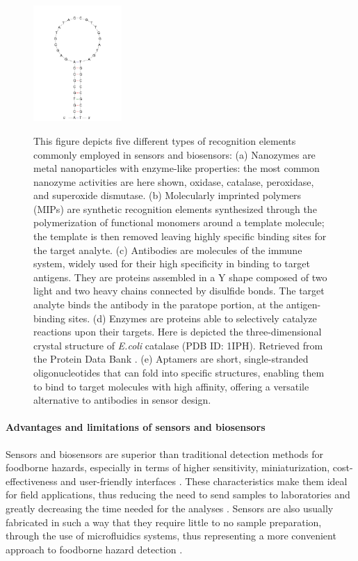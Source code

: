 \begin{figure}[!ht]
{        \includegraphics[width=0.3\textwidth]{figures/chapter1/sensors/Fig1_Aptamer.pdf}
        \label{fig:apta}
    }
    \caption{This figure depicts five different types of recognition elements commonly employed in sensors and biosensors:
    (a) Nanozymes are metal nanoparticles with enzyme-like properties: the most common nanozyme activities are here shown, \ie{} oxidase, catalase, peroxidase, and superoxide dismutase.
    (b) Molecularly imprinted polymers (MIPs) are synthetic recognition elements synthesized through the polymerization of functional monomers around a template molecule; the template is then removed leaving highly specific binding sites for the target analyte.
    (c) Antibodies are molecules of the immune system, widely used for their high specificity in binding to target antigens. They are proteins assembled in a Y shape composed of two light and two heavy chains connected by disulfide bonds. The target analyte binds the antibody in the paratope portion, \ie{} at the antigen-binding sites.  
    (d) Enzymes are proteins able to selectively catalyze reactions upon their targets. Here is depicted the three-dimensional crystal structure of \textit{E.coli} catalase (PDB ID: 1IPH). Retrieved from the Protein Data Bank \citep{bravoCrystal1995,bravoRCSB}.
    (e) Aptamers are short, single-stranded oligonucleotides that can fold into specific structures, enabling them to bind to target molecules with high affinity, offering a versatile alternative to antibodies in sensor design.}
    \label{fig:recognitionElements}
\end{figure}

\paragraph{Advantages and limitations of sensors and biosensors}
Sensors and biosensors are superior than traditional detection methods for foodborne hazards, especially in terms of higher sensitivity, miniaturization, cost-effectiveness and user-friendly interfaces \citep{perfezouCancer2012,cardenosa-rubioRecent2019,yangDynamic2022}. These characteristics make them ideal for field applications, thus reducing the need to send samples to laboratories and greatly decreasing the time needed for the analyses \citep{byrneAntibodyBased2009,sonPortable2017,zhangApplying2017}. Sensors are also usually fabricated in such a way that they require little to no sample preparation, \eg{} through the use of microfluidics systems, thus representing a more convenient approach to foodborne hazard detection \citep{hendricksonSensitive2021,liRapid2021}.

